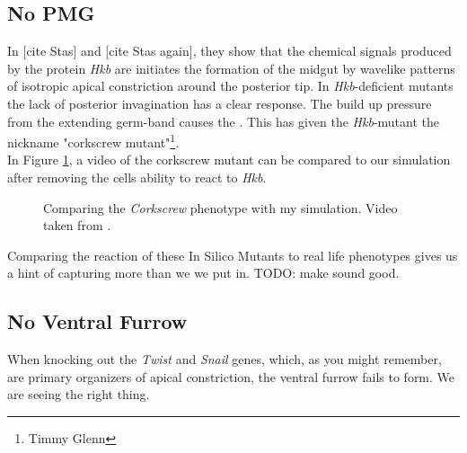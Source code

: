 \subsection{No PMG}
In [cite Stas] and [cite Stas again], they show that the chemical signals produced by the protein \textit{Hkb} are initiates the formation of the midgut by wavelike patterns of isotropic apical constriction around the posterior tip. In \textit{Hkb}-deficient mutants the lack of posterior invagination has a clear response. The build up pressure from the extending germ-band causes the . This has given the \textit{Hkb}-mutant the nickname "corkscrew mutant"\footnote{Timmy Glenn}.\\

In Figure \ref{fig:corkscrew-comparison}, a video of the corkscrew mutant can be compared to our simulation after removing the cells ability to react to \textit{Hkb}.

 
\begin{figure}[H]
    \centering
    \caption{Comparing the \textit{Corkscrew} phenotype with my simulation. Video taken from \cite{smits2023maintaining}.}
    \label{fig:corkscrew-comparison}
\end{figure}

Comparing the reaction of these In Silico Mutants to real life phenotypes gives us a hint of capturing more than we we put in. TODO: make sound good. 

\subsection{No Ventral Furrow}
When knocking out the \textit{Twist} and \textit{Snail} genes, which, as you might remember, are primary organizers of apical constriction, the ventral furrow fails to form. 
We are seeing the right thing.



